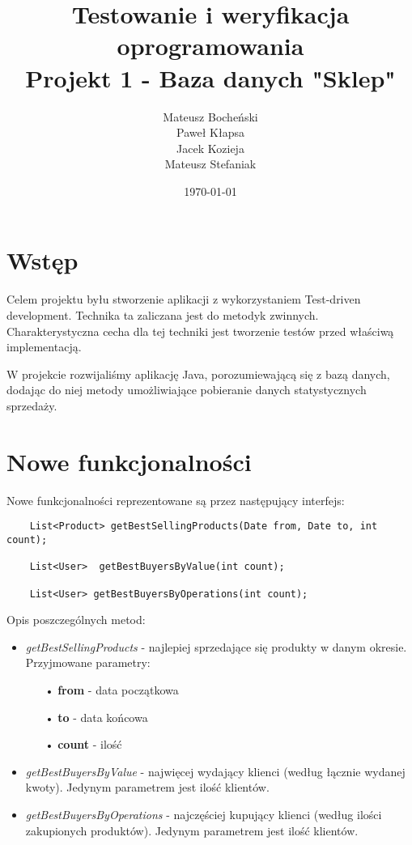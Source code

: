 \documentclass[a4paper,11pt,notitlepage]{article}
\author{Mateusz Bocheński\\Paweł Kłapsa\\Jacek Kozieja\\Mateusz Stefaniak}
\title{Testowanie i weryfikacja oprogramowania \\ {\small Projekt 1 - Baza danych "Sklep"}}
\date{\today}
\begin{document}
\maketitle
\tableofcontents

\section{Wstęp}
Celem projektu byłu stworzenie aplikacji z wykorzystaniem Test-driven development. Technika ta zaliczana jest do metodyk zwinnych. Charakterystyczna cecha dla tej techniki jest tworzenie testów przed właściwą implementacją.

W projekcie rozwijaliśmy aplikację Java, porozumiewającą się z bazą danych, dodając do niej metody umożliwiające pobieranie danych statystycznych sprzedaży.

\section{Nowe funkcjonalności}
Nowe funkcjonalności reprezentowane są przez następujący interfejs:
\begin{footnotesize}\begin{verbatim}
    List<Product> getBestSellingProducts(Date from, Date to, int count);

    List<User>  getBestBuyersByValue(int count);

    List<User> getBestBuyersByOperations(int count);
\end{verbatim}\end{footnotesize}

Opis poszczególnych metod:

\begin{itemize}
	\item \textit{getBestSellingProducts} - najlepiej sprzedające się produkty w danym okresie. Przyjmowane parametry:
		\begin{itemize}
			\item[•] \textbf{from} - data początkowa
			\item[•] \textbf{to} - data końcowa
			\item[•] \textbf{count} - ilość 
		\end{itemize}
	\item \textit{getBestBuyersByValue} - najwięcej wydający klienci (według łącznie wydanej kwoty). Jedynym parametrem jest ilość klientów.
	\item \textit{getBestBuyersByOperations} - najczęściej kupujący klienci (według ilości zakupionych produktów). Jedynym parametrem jest ilość klientów.
\end{itemize}
\end{document}
